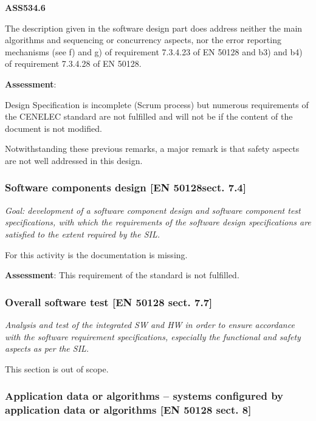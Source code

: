 \bigskip

{\bfseries
ASS534.6}

The description given in the software design part does address neither the main algorithms and sequencing or concurrency
aspects, nor the error reporting mechanisms (see f) and g) of requirement 7.3.4.23 of EN 50128 and b3) and b4) of
requirement 7.3.4.28 of EN 50128. 


\bigskip

\textbf{Assessment}:

Design Specification is incomplete (Scrum process) but numerous requirements of the CENELEC standard are not fulfilled
and will not be if the content of the document is not modified. 

Notwithstanding these previous remarks, a major remark is that safety aspects are not well addressed in this design.

\subsubsection{Software components design [EN 50128sect. 7.4]}
\textit{Goal: development of a software component design and software component test specifications, with which the requirements of the software design specifications are satisfied to the extent required by the SIL.}

\bigskip
For this activity is the documentation is missing.

\bigskip

\textbf{Assessment}:
\bigskip
This requirement of the standard is not fulfilled.

\bigskip

\subsubsection{Overall software test [EN 50128 sect. 7.7]}
\textit{Analysis and test of the integrated SW and HW in order to ensure accordance with the software requirement specifications, especially the functional and safety aspects as per the SIL.}


\bigskip

This section is out of scope.
\bigskip

\subsubsection{Application data or algorithms -- systems configured by application data or algorithms [EN 50128 sect. 8]}

